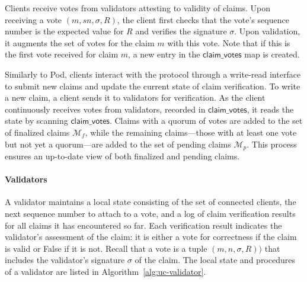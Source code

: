 \documentclass{article}
\begin{document}
Clients receive votes from validators attesting to validity of claims. Upon receiving a vote $(m, sn,\sigma, R)$, the client first checks that the vote's sequence number is the expected value for $R$ and verifies the signature $\sigma$. Upon validation, it augments the set of votes for the claim $m$ with this vote. Note that if this is the first vote received for claim $m$, a new entry in the $\textsf{claim\_votes}$ map is created.  

Similarly to Pod, clients interact with the protocol through a write-read interface to submit new claims and update the current state of claim verification. To write a new claim, a client sends it to validators for verification. As the client continuously receives votes from validators, recorded in $\textsf{claim\_votes}$, it reads the state by scanning $\textsf{claim\_votes}$. Claims with a quorum of votes are added to the set of finalized claims $\mathcal{M}_f$, while the remaining claims—those with at least one vote but not yet a quorum—are added to the set of pending claims $\mathcal{M}_p$. This process ensures an up-to-date view of both finalized and pending claims.


\paragraph{Validators\\}
A validator maintains a local state consisting of the set of connected clients, the next sequence number to attach to a vote, and a log  of claim verification results for all claims it has encountered so far. Each verification result indicates the validator’s assessment of the claim: it is either a vote for correctness if the claim is valid or \textsf{False} if it is not. Recall that a vote is a tuple $(m, n, \sigma, R))$ that includes the validator's signature $\sigma$ of the claim. The local state and procedures of a validator are listed in Algorithm~\ref{alg:uc-validator}.
\end{document}
